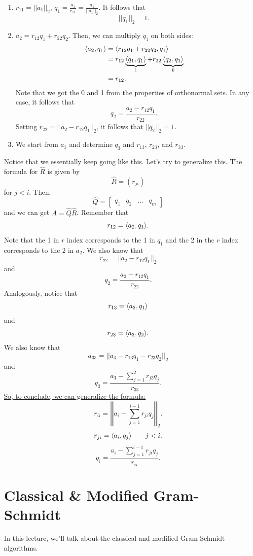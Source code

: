 \documentclass[letterpaper]{article}
\newcommand{\0}{\mathbf{0}}
\begin{document}
\begin{enumerate}
    \item $r_{11} = ||a_1||_2$, $q_1 = \frac{a_1}{r_{11}} = \frac{a_1}{||a_1||_2}$. It follows that \[||q_1||_2 = 1.\]
    \item $a_2 = r_{12}q_1 + r_{22}q_2$. Then, we can multiply $q_1$ on both sides: 
    \begin{equation*}
        \begin{aligned}
            \langle a_2, q_1 \rangle &= \langle r_{12}q_1 + r_{22}q_2, q_1 \rangle \\ 
                &= r_{12}\underbrace{\langle q_1, q_1 \rangle}_{1} + r_{22} \underbrace{\langle q_2, q_1 \rangle}_{0} \\ 
                &= r_{12}.
        \end{aligned}
    \end{equation*}
    Note that we got the 0 and 1 from the properties of orthonormal sets. In any case, it follows that \[q_2 = \frac{a_2 - r_{12}q_1}{r_{22}}.\]
    Setting $r_{22} = ||a_2 - r_{12}q_1||_2$, it follows that $||q_2||_2 = 1$. 

    \item We start from $a_3$ and determine $q_3$ and $r_{13}$, $r_{23}$, and $r_{33}$. 
\end{enumerate}
Notice that we essentially keep going like this. Let's try to generalize this. The formula for $\hat{R}$ is given by 
\[\hat{R} = (r_{ji})\]
for $j < i$. Then, \[\hat{Q} = \begin{bmatrix}
    q_1 & q_2 & \hdots & q_m
\end{bmatrix}\] and we can get $A = \hat{Q} \hat{R}$. Remember that 
\[r_{12} = \langle a_2, q_1 \rangle.\] Note that the 1 in $r$ index corresponds to the 1 in $q_1$ and the 2 in the $r$ index corresponds to the 2 in $a_2$. We also know that 
\[r_{22} = ||a_2 - r_{12}q_1||_2\] and 
\[q_2 = \frac{a_2 - r_{12}q_1}{r_{22}}.\]
Analogously, notice that 
\[r_{13} = \langle a_3, q_1 \rangle\] and \[r_{23} = \langle a_3, q_2 \rangle.\] We also know that \[a_{33} = ||a_3 - r_{13}q_1 - r_{23}q_2||_2\] and \[q_3 = \frac{a_3 - \sum_{j = 1}^{2} r_{j3} q_j}{r_{33}}.\] 
\underline{So, to conclude, we can generalize the formula:}
\[r_{ii} = \left|\left| a_{i} - \sum_{j = 1}^{i - 1} r_{ji} q_j \right|\right|_2.\]
\[r_{ji} = \langle a_i, q_j \rangle \qquad j < i.\]
\[q_i = \frac{a_i - \sum_{j = 1}^{i - 1} r_{ji} q_j}{r_{ii}}.\]

\section{Classical \& Modified Gram-Schmidt}
In this lecture, we'll talk about the classical and modified Gram-Schmidt algorithms. 
\end{document}
